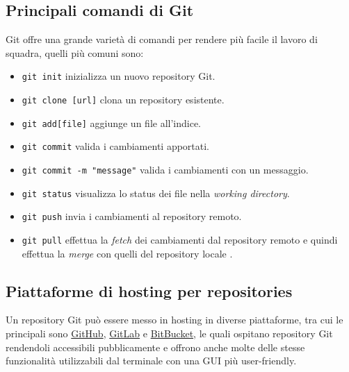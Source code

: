 \subsection{Principali comandi di Git}
Git offre una grande varietà di comandi per rendere più facile il lavoro di squadra, quelli più comuni sono:
\begin{itemize}
    \item \Verb_git init_ inizializza un nuovo repository Git.
    \item \Verb_git clone [url]_ clona un repository esistente.
    \item \Verb_git add[file]_ aggiunge un file all'indice.
    \item \Verb_git commit_ valida i cambiamenti apportati.
    \item \Verb_git commit -m "message"_ valida i cambiamenti con un messaggio.
    \item \Verb_git status_ visualizza lo status dei file nella \textit{working directory}.
    \item \Verb_git push_ invia i cambiamenti al repository remoto.
    \item \Verb_git pull_ effettua la \textit{fetch} dei cambiamenti dal repository remoto e quindi effettua la \textit{merge} con quelli del repository locale \cite{Git}.
\end{itemize}

\subsection{Piattaforme di hosting per repositories}
Un repository Git può essere messo in hosting in diverse piattaforme, tra cui le principali sono \href{https://github.com/}{GitHub}, \href{https://gitlab.com/}{GitLab} e \href{https://bitbucket.org/}{BitBucket}, le quali ospitano repository Git rendendoli accessibili pubblicamente e offrono anche molte delle stesse funzionalità utilizzabili dal terminale con una GUI più user-friendly.
